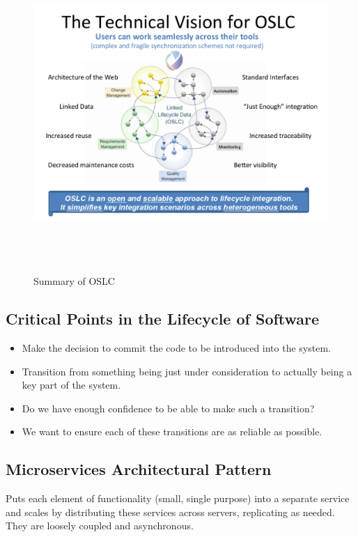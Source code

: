 \documentclass[a4paper]{article}
\begin{document}
\begin{figure}[h]
\begin{center} 
    \includegraphics[scale=0.8,width = 15cm, height = 12cm]{images/OSLC.pdf}
    \caption{Summary of OSLC}
\end{center}
\end{figure}

\subsection{Critical Points in the Lifecycle of Software}
\begin{itemize}
\item  Make the decision to commit the code to be introduced into the system.
\item  Transition from something being just under consideration to actually being a key part of the system.
\item  Do we have enough confidence to be able to make such a transition?
\item  We want to ensure each of these transitions are as reliable as possible. 
\end{itemize}

\subsection{Microservices Architectural Pattern}
Puts each element of functionality (small, single purpose) into a separate service and scales by distributing these services across servers, replicating as needed. They are loosely coupled and asynchronous.
\end{document}
